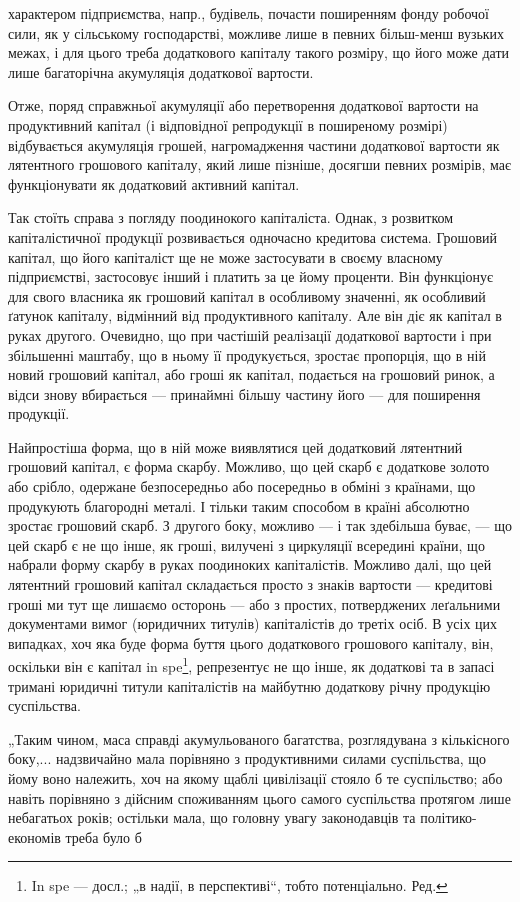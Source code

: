 характером підприємства, напр., будівель, почасти поширенням фонду
робочої сили, як у сільському господарстві, можливе лише в певних
більш-менш вузьких межах, і для цього треба додаткового капіталу
такого розміру, що його може дати лише багаторічна акумуляція додаткової
вартости.

Отже, поряд справжньої акумуляції або перетворення додаткової
вартости на продуктивний капітал (і відповідної репродукції в поширеному
розмірі) відбувається акумуляція грошей, нагромадження частини додаткової
вартости як лятентного грошового капіталу, який лише пізніше,
досягши певних розмірів, має функціонувати як додатковий активний
капітал.

Так стоїть справа з погляду поодинокого капіталіста. Однак, з розвитком
капіталістичної продукції розвивається одночасно кредитова система.
Грошовий капітал, що його капіталіст ще не може застосувати в своєму
власному підприємстві, застосовує інший і платить за це йому проценти. Він
функціонує для свого власника як грошовий капітал в особливому
значенні, як особливий ґатунок капіталу, відмінний від продуктивного
капіталу. Але він діє як капітал в руках другого. Очевидно, що при
частішій реалізації додаткової вартости і при збільшенні маштабу, що
в ньому її продукується, зростає пропорція, що в ній новий грошовий
капітал, або гроші як капітал, подається на грошовий ринок, а відси
знову вбирається — принаймні більшу частину його — для поширення
продукції.

Найпростіша форма, що в ній може виявлятися цей додатковий лятентний
грошовий капітал, є форма скарбу. Можливо, що цей скарб є
додаткове золото або срібло, одержане безпосередньо або посередньо
в обміні з країнами, що продукують благородні металі. І тільки таким
способом в країні абсолютно зростає грошовий скарб. З другого боку,
можливо — і так здебільша буває, — що цей скарб є не що інше, як
гроші, вилучені з циркуляції всередині країни, що набрали форму скарбу
в руках поодиноких капіталістів. Можливо далі, що цей лятентний грошовий
капітал складається просто з знаків вартости — кредитові гроші
ми тут ще лишаємо осторонь — або з простих, потверджених леґальними
документами вимог (юридичних титулів) капіталістів до третіх осіб. В
усіх цих випадках, хоч яка буде форма буття цього додаткового грошового
капіталу, він, оскільки він є капітал in spe\footnote*{
In spe — досл.; „в надії, в перспективі“, тобто потенціально. Ред.
}, репрезентує не
що інше, як додаткові та в запасі тримані юридичні титули капіталістів на
майбутню додаткову річну продукцію суспільства.

„Таким чином, маса справді акумульованого багатства, розглядувана
з кількісного боку,... надзвичайно мала порівняно з продуктивними
силами суспільства, що йому воно належить, хоч на якому щаблі цивілізації
стояло б те суспільство; або навіть порівняно з дійсним споживанням
цього самого суспільства протягом лише небагатьох років; остільки
мала, що головну увагу законодавців та політико-економів треба було б